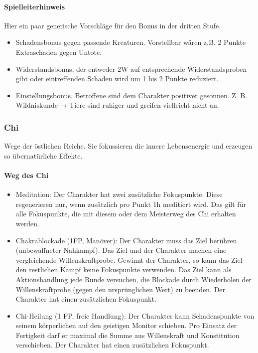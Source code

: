 \documentclass{article}
\begin{document}
\begin{mdframed}[hidealllines=true, backgroundcolor=black!10]
\paragraph{Spielleiterhinweis}

Hier ein paar generische Vorschläge für den Bonus in der dritten Stufe.

\begin{itemize}
\item Schadensbonus gegen passende Kreaturen. Vorstellbar wären z.B. 2 Punkte Extraschaden gegen Untote.
\item Widerstandsbonus, der entweder 2W auf entsprechende Widerstandsproben gibt oder eintreffenden Schaden wird um 1 bis 2 Punkte reduziert.
\item Einstellungsbonus. Betroffene sind dem Charakter positiver gesonnen. Z. B. Wildniskunde → Tiere sind ruhiger und greifen vielleicht nicht an.
\end{itemize}



\end{mdframed}
\subsubsection{Chi}

Wege der östlichen Reiche. Sie fokussieren die innere Lebensenergie und erzeugen so übernatürliche Effekte.

\paragraph{Weg des Chi}

\begin{itemize}
\item Meditation: Der Charakter hat zwei zusätzliche Fokuspunkte. Diese regenerieren nur, wenn zusätzlich pro Punkt 1h meditiert wird. Das gilt für alle Fokuspunkte, die mit diesem oder dem Meisterweg des Chi erhalten werden.
\item Chakrablockade (1FP, Manöver): Der Charakter muss das Ziel berühren (unbewaffneter Nahkampf). Das Ziel und der Charakter machen eine vergleichende Willenskraftprobe. Gewinnt der Charakter, so kann das Ziel den restlichen Kampf keine Fokuspunkte verwenden. Das Ziel kann als Aktionshandlung jede Runde versuchen, die Blockade durch Wiederholen der Willenskraftprobe (gegen den ursprünglichen Wert) zu beenden. Der Charakter hat einen zusätzlichen Fokuspunkt.
\item Chi-Heilung (1 FP, freie Handlung): Der Charakter kann Schadenspunkte von seinem körperlichen auf den geistigen Monitor schieben. Pro Einsatz der Fertigkeit darf er maximal die Summe aus Willenskraft und Konstitution verschieben. Der Charakter hat einen zusätzlichen Fokuspunkt.
\end{itemize}
\end{document}
